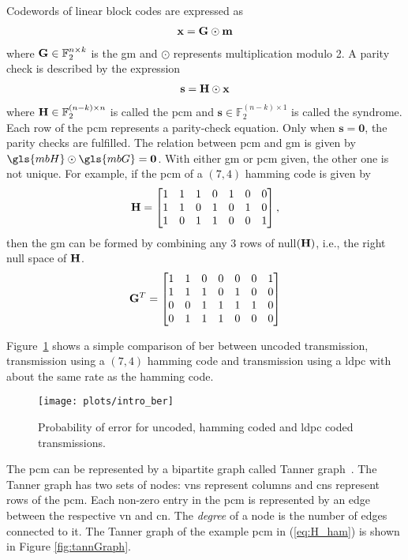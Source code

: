 Codewords of linear block codes are expressed as \begin{align}\mathbf{x}=\mathbf{G}\odot\mathbf{m}\end{align} where $\mathbf{G}\in\mathbb{F}_2^{n\times k}$ is the \gls{gm} and $\odot$ represents multiplication modulo 2. A parity check is described by the expression \begin{align}\mathbf{s}=\mathbf{H}\odot\mathbf{x}\end{align} where $\mathbf{H}\in\mathbb{F}_2^{(n-k)\times n}$ is called the \gls{pcm} and $\mathbf{s}\in\mathbb{F}_2^{(n-k)\times 1}$ is called the syndrome. Each row of the \gls{pcm} represents a parity-check equation. Only when $\mathbf{s}=\mathbf{0}$, the parity checks are fulfilled. The relation between \gls{pcm} and \gls{gm} is given by $\gls{mbH}\odot\gls{mbG}=\mathbf{0}$. With either \gls{gm} or \gls{pcm} given, the other one is not unique. For example, if the \gls{pcm} of a $(7,4)$ hamming code is given by
\begin{align} \label{eq:H_ham}
\mathbf{H} =
\begin{bmatrix}
1 &1 &1 &0 &1 &0 &0 \\
1 &1 &0 &1 &0 &1 &0 \\
1 &0 &1 &1 &0 &0 &1
\end{bmatrix},
\end{align}
then the \gls{gm} can be formed by combining any 3 rows of null$(\mathbf{H})$, i.e., the right null space of $\mathbf{H}$.
\begin{align} \label{eq:G_ham}
\mathbf{G}^T =
\begin{bmatrix}
1 &1 &0 &0 &0 &0 &1 \\
1 &1 &1 &0 &1 &0 &0 \\
0 &0 &1 &1 &1 &1 &0 \\
0 &1 &1 &1 &0 &0 &0
\end{bmatrix}
\end{align}

Figure~\ref{fig:intro_ber} shows a simple comparison of \gls{ber} between uncoded transmission, transmission using a $(7,4)$ hamming code and transmission using a \gls{ldpc} with about the same rate as the hamming code.
\begin{figure}[htbp]
  \centering
  \texttt{[image: plots/intro\_ber]}
  \caption{Probability of error for uncoded, hamming coded and \gls{ldpc} coded transmissions.}
  \label{fig:intro_ber}
\end{figure}

The \gls{pcm} can be represented by a bipartite graph called Tanner graph~\cite{Tanner1981}. The Tanner graph has two sets of nodes: \glspl{vn} represent columns and \glspl{cn} represent rows of the \gls{pcm}. Each non-zero entry in the \gls{pcm} is represented by an edge between the respective \gls{vn} and \gls{cn}. The \emph{degree} of a node is the number of edges connected to it. The Tanner graph of the example \gls{pcm} in (\ref{eq:H_ham}) is shown in Figure \ref{fig:tannGraph}.


